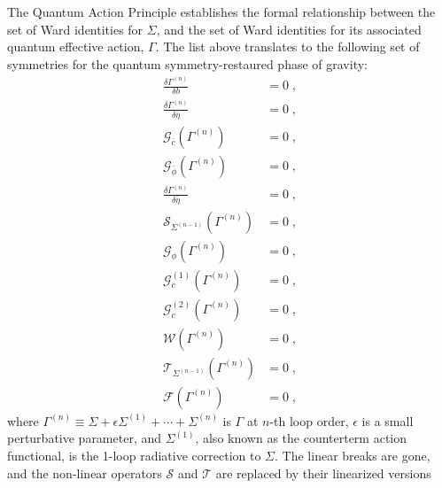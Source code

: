 \documentclass[../main.tex]{subfiles}
\begin{document}
The Quantum Action Principle establishes the formal relationship between the set of Ward identities for $ \Sigma $, and the set of Ward identities for its associated quantum effective action, $ \Gamma $. The list above translates to the following set of symmetries for the quantum symmetry-restaured phase of gravity:
\begin{subequations}%
  \label{eq:ward-identities}
  \begin{align}
    \frac{ \delta \Gamma^{ \left( n \right) } }{ \delta b }            & = 0 \;,                                \\
    \frac{ \delta \Gamma^{ \left( n \right) } }{ \delta \bar{ \eta } } & = 0 \;,                                \\
    \mathcal{G}_{ \bar{ c } } \left( \Gamma ^{ (n) } \right)           & = 0 \;,                                \\
    \mathcal{G}_{ \bar{ \phi  } } \left( \Gamma ^{ (n) } \right)       & = 0 \;,                                \\
    \frac{ \delta \Gamma^{ \left( n \right) } }{ \delta \bar{ \eta } } & = 0 \;,                                \\
    \mathcal{S}_{\Sigma^{(n-1)}} \left( \Gamma^{ (n)} \right)          & = 0 \;, \label{eq:quantum-st-identity} \\
    \mathcal{G}_{ \phi } \left( \Gamma ^{ (n) } \right)                & = 0 \;,                                \\
    \mathcal{G}^{(1)}_{ c } \left( \Gamma ^{ (n) } \right)             & = 0 \;,                                \\
    \mathcal{G}^{(2)}_{ c } \left( \Gamma ^{ (n) } \right)             & = 0 \;,                                \\
    \mathcal{W} \left( \Gamma^{ (n)} \right)                           & = 0 \;,                                \\
    \mathcal{T}_{\Sigma^{(n-1)}} \left( \Gamma^{ (n)} \right)          & = 0 \;,                                \\
    \mathcal{F} \left( \Gamma^{ (n)} \right)                           & = 0 \;,
  \end{align}
\end{subequations}
where $\Gamma^{(n)} \equiv \Sigma + \epsilon \Sigma^{(1)} + \cdots + \Sigma^{ (n) }$ is $ \Gamma  $ at $ n $-th loop order, $ \epsilon $ is a small perturbative parameter, and $ \Sigma^{ (1)} $, also known as the counterterm action functional, is the 1-loop radiative correction to $ \Sigma  $. The linear breaks are gone, and the non-linear operators $ \mathcal{S} $ and $ \mathcal{T} $ are replaced by their linearized versions
\end{document}
